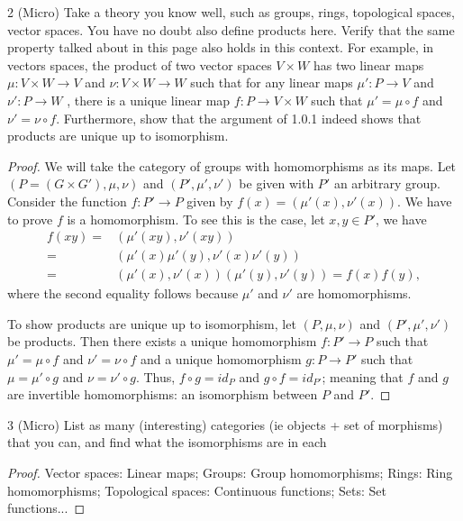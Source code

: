 \begin{exercise}{2 (Micro)}
Take a theory you know well, such as groups, rings, topological spaces, vector spaces. 
You have no doubt also define products here. 
Verify that the same property talked about in this page also holds in this context. 
For example, in vectors spaces, the product of two vector spaces $V \times W$ has two linear maps $\mu: V \times W \to V$ and $\nu: V \times W \to W$ such that for any linear maps $\mu': P \to V$ and $\nu': P \to W$ , there is a unique linear map $f: P \to V \times W$ such that $\mu' = \mu \circ f$ and $\nu' = \nu \circ f$.
Furthermore, show that the argument of 1.0.1 indeed shows that products are unique up to isomorphism.
\end{exercise}
\begin{proof}
We will take the category of groups with homomorphisms as its maps.
Let $(P = (G \times G'), \mu, \nu)$ and $(P', \mu', \nu')$ be given with $P'$ an arbitrary group.
Consider the function $f: P' \to P$ given by $f(x) = (\mu'(x), \nu'(x))$.
We have to prove $f$ is a homomorphism.
To see this is the case, let $x, y \in P'$, we have 
\begin{align*}
    f(x y) 
    =& (\mu'(x y), \nu'(x y))\\
    =& (\mu'(x) \mu'(y), \nu'(x) \nu'(y))\\
    =& (\mu'(x), \nu'(x)) (\mu'(y), \nu'(y))
    = f(x) f(y),
\end{align*}
where the second equality follows because $\mu'$ and $\nu'$ are homomorphisms.

To show products are unique up to isomorphism, let $(P, \mu, \nu)$ and $(P', \mu', \nu')$ be products.
Then there exists a unique homomorphism $f: P' \to P$ such that $\mu' = \mu \circ f$ and $\nu' = \nu \circ f$ and a unique homomorphism $g: P \to P'$ such that $\mu = \mu' \circ g$ and $\nu = \nu' \circ g$.
Thus, $f \circ g = id_P$ and $g \circ f = id_{P'}$;
meaning that $f$ and $g$ are invertible homomorphisms: an isomorphism between $P$ and $P'$.
\end{proof} 

\begin{exercise}{3 (Micro)}
List as many (interesting) categories (ie objects + set of morphisms) that you can, and find what the isomorphisms are in each 
\end{exercise}
\begin{proof}
Vector spaces: Linear maps; Groups: Group homomorphisms; Rings: Ring homomorphisms; Topological spaces: Continuous functions; Sets: Set functions...
\end{proof} 

